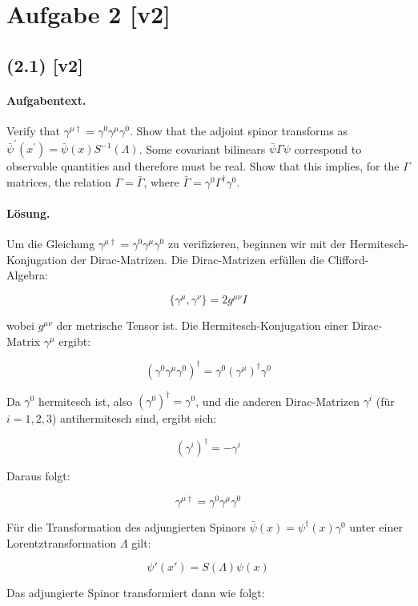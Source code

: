 \documentclass[11pt,a4paper]{article}
\begin{document}
\section*{Aufgabe 2 [v2]}
\subsection*{(2.1) [v2]}
\paragraph{Aufgabentext.}
Verify that $\gamma^{\mu \dagger}=\gamma^0 \gamma^\mu \gamma^0$. Show that the adjoint spinor transforms as $\bar{\psi}^{\prime}\left(x^{\prime}\right)= \bar{\psi}(x) S^{-1}(\Lambda)$. Some covariant bilinears $\bar{\psi} \Gamma \psi$ correspond to observable quantities and therefore must be real. Show that this implies, for the $\Gamma$ matrices, the relation $\Gamma=\bar{\Gamma}$, where $\bar{\Gamma}=\gamma^0 \Gamma^{\dagger} \gamma^0$.

\paragraph{Lösung.}
Um die Gleichung \(\gamma^{\mu \dagger} = \gamma^0 \gamma^\mu \gamma^0\) zu verifizieren, beginnen wir mit der Hermitesch-Konjugation der Dirac-Matrizen. Die Dirac-Matrizen erfüllen die Clifford-Algebra:

\[
\{\gamma^\mu, \gamma^\nu\} = 2g^{\mu\nu}I
\]

wobei \(g^{\mu\nu}\) der metrische Tensor ist. Die Hermitesch-Konjugation einer Dirac-Matrix \(\gamma^\mu\) ergibt:

\[
(\gamma^0 \gamma^\mu \gamma^0)^\dagger = \gamma^0 (\gamma^\mu)^\dagger \gamma^0
\]

Da \(\gamma^0\) hermitesch ist, also \((\gamma^0)^\dagger = \gamma^0\), und die anderen Dirac-Matrizen \(\gamma^i\) (für \(i = 1, 2, 3\)) antihermitesch sind, ergibt sich:

\[
(\gamma^i)^\dagger = -\gamma^i
\]

Daraus folgt:

\[
\gamma^{\mu \dagger} = \gamma^0 \gamma^\mu \gamma^0
\]

Für die Transformation des adjungierten Spinors \(\bar{\psi}(x) = \psi^\dagger(x) \gamma^0\) unter einer Lorentztransformation \(\Lambda\) gilt:

\[
\psi'(x') = S(\Lambda) \psi(x)
\]

Das adjungierte Spinor transformiert dann wie folgt:
\end{document}

